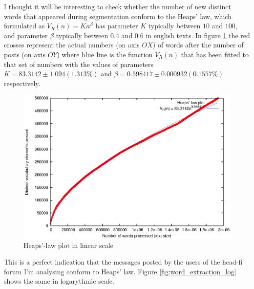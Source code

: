      I thought it will be interesting to check whether the number of new distinct words that appeared during segmentation conform to the Heaps' law, which formulated as $V_R(n) = Kn^\beta$ has parameter $K$ typically between $10$ and $100$, and parameter $\beta$ typically between $0.4$ and $0.6$ in english texts. In figure \ref{fig:word_extraction} the red crosses represent the actual numbers (on axis $OX$) of words after the number of posts (on axis $OY$) where blue line is the function $V_R(n)$ that has been fitted to that set of numbers with the values of parameters $K = 83.3142 \pm1.094 (1.313\%)$ and $\beta = 0.598417 \pm0.000932 (0.1557\%)$ respectively. 
      
      \begin{figure}[H]
        \centering
        \includegraphics[width=\textwidth]{chapters/03_implementation/extraction}
        \caption{Heaps'-law plot in linear scale}
        \label{fig:word_extraction}
      \end{figure}
      
      This is a perfect indication that the messages posted by the users of the head-fi forum I'm analysing conform to Heaps' law. Figure \ref{fig:word_extraction_log} shows the same in logarythmic scale.
      
